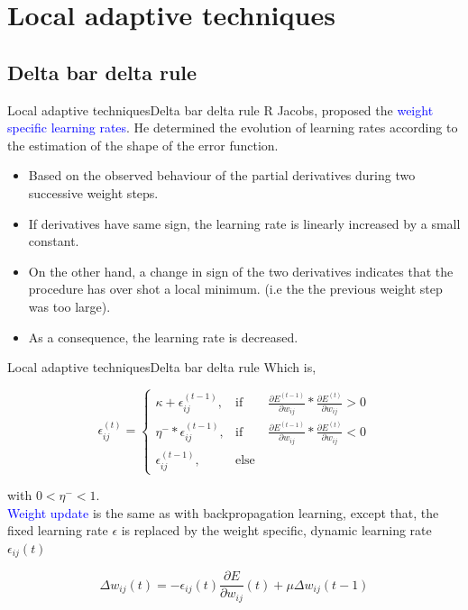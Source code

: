 \documentclass{beamer}
\begin{document}
	
\section{Local adaptive techniques}
\subsection{Delta bar delta rule}
\begin{frame}{Local adaptive techniques}{Delta bar delta rule}
R Jacobs, proposed the 	\textcolor{blue}{weight specific learning rates}. He determined the evolution of learning rates according to the estimation of the shape of the error function. 

\pause
\begin{itemize}
\item Based on the observed behaviour of the partial derivatives during two successive weight steps. 
\item If derivatives have same sign, the learning rate is linearly increased by a small constant.  
\item On the other hand, a change in sign of the two derivatives indicates that the procedure has over shot a local minimum. (i.e the the previous weight step was too large). 
\item As a consequence, the learning rate is decreased. 
\end{itemize}
\end{frame}	

\begin{frame}{Local adaptive techniques}{Delta bar delta rule}
Which is,	

\[
\epsilon_{ij}^{(t)} = \begin{cases}
	\kappa + \epsilon_{ij}^{(t-1)} , & \text{if} \qquad \frac{\partial E^{(t-1)}}{\partial w_{ij}} * \frac{\partial E^{(t)}}{\partial w_{ij}} > 0 \\
	
	\eta^- * \epsilon_{ij}^{(t-1)} , & \text{if} \qquad \frac{\partial E^{(t-1)}}{\partial w_{ij}} * \frac{\partial E^{(t)}}{\partial w_{ij}} < 0 \\
	
	\epsilon_{ij}^{(t-1)} , & \text{else}

\end{cases}
\]

with $  0< \eta^- < 1 $. \\
\pause
\vspace{3mm}
\textcolor{blue}{Weight update} is the same as with backpropagation learning, except that, the fixed learning rate $ \epsilon $ is replaced by the weight specific, dynamic learning rate $ \epsilon_{ij} (t) $

\begin{equation*}
\Delta w_{ij} (t)  = -\epsilon_{ij}(t) \frac{\partial E}{\partial w_{ij}}(t) + \mu \Delta w_{ij} (t-1) 
\end{equation*}

\end{frame}
\end{document}
